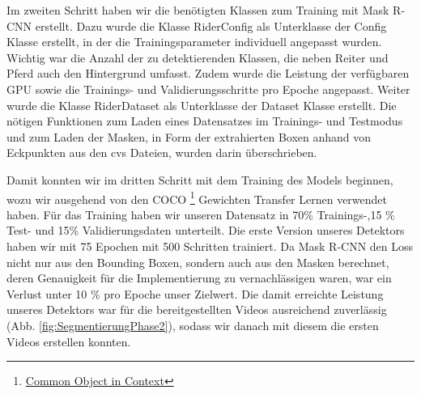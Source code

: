 Im zweiten Schritt haben wir die benötigten Klassen zum Training mit Mask R-CNN erstellt. Dazu wurde die Klasse RiderConfig als Unterklasse der Config Klasse erstellt, in der die Trainingsparameter individuell angepasst wurden. Wichtig war die Anzahl der zu detektierenden Klassen, die neben Reiter und Pferd auch den Hintergrund umfasst. Zudem wurde die Leistung der verfügbaren GPU sowie die Trainings- und Validierungsschritte pro Epoche angepasst. 
Weiter wurde die Klasse RiderDataset als Unterklasse der Dataset Klasse erstellt. Die nötigen Funktionen zum Laden eines Datensatzes im Trainings- und Testmodus und zum Laden der Masken, in Form der extrahierten Boxen anhand von Eckpunkten aus den cvs Dateien, wurden darin überschrieben.

Damit konnten wir im dritten Schritt mit dem Training des Models beginnen, wozu wir ausgehend von den COCO \footnote{\href{http://cocodataset.org/}{Common Object in Context}} Gewichten Transfer Lernen verwendet haben. Für das Training haben wir unseren Datensatz in 70\% Trainings-,15 \% Test- und 15\% Validierungsdaten unterteilt. Die erste Version unseres Detektors haben wir mit 75 Epochen mit 500 Schritten trainiert. Da Mask R-CNN den Loss nicht nur aus den Bounding Boxen, sondern auch aus den Masken berechnet, deren Genauigkeit für die Implementierung zu vernachlässigen waren, war ein Verlust unter 10 \% pro Epoche unser Zielwert. Die damit erreichte Leistung unseres Detektors war für die bereitgestellten Videos ausreichend zuverlässig (Abb. \ref{fig:SegmentierungPhase2}), sodass wir danach mit diesem die ersten Videos erstellen konnten.

